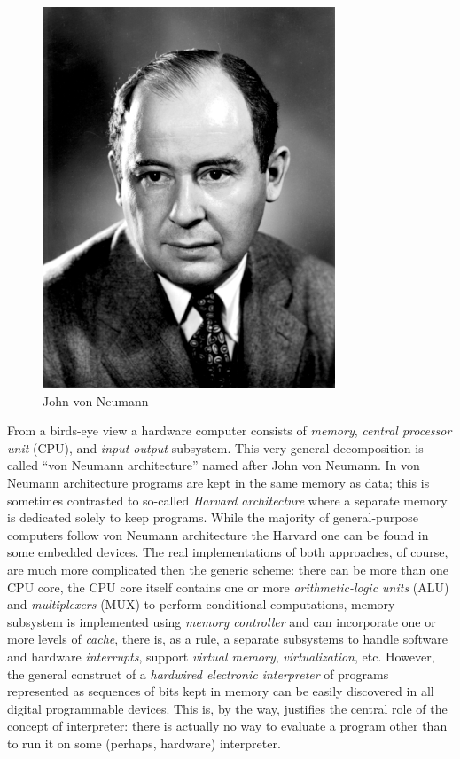 \begin{figure}[t]
  \centering
  \includegraphics[scale=0.5]{images/JohnvonNeumann.png}
  \caption{John von Neumann}
\end{figure}

From a birds-eye view a hardware computer consists of \emph{memory}, \emph{central processor unit} (CPU), and
\emph{input-output} subsystem. This very general decomposition is called ``von Neumann architecture'' named
after John von Neumann. In von Neumann architecture programs are kept in the same memory as data; this is
sometimes contrasted to so-called \emph{Harvard architecture} where a separate memory is dedicated solely to
keep programs. While the majority of general-purpose computers follow von Neumann architecture the Harvard one can be
found in some embedded devices. The real implementations of both approaches, of course, are much more complicated then
the generic scheme: there can be more than one CPU core, the CPU core itself contains one or more \emph{arithmetic-logic units} (ALU) and
\emph{multiplexers} (MUX) to perform conditional computations, memory subsystem is implemented using \emph{memory controller} and can
incorporate one or more levels of \emph{cache}, there is, as a rule, a separate subsystems to handle software and hardware \emph{interrupts},
support \emph{virtual memory}, \emph{virtualization}, etc. However, the general construct of a \emph{hardwired electronic interpreter}
of programs represented as sequences of bits kept in memory can be easily discovered in all digital programmable devices. This is,
by the way, justifies the central role of the concept of interpreter: there is actually no way to evaluate a program other than
to run it on some (perhaps, hardware) interpreter.

